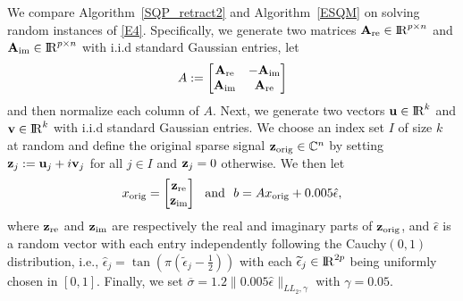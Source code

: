 \documentclass[10pt]{article}
\numberwithin{equation}{section}
\def\R{{\rm I\!R}}
\def\xorig{{x_{\rm orig}}}
\begin{document}
{\color{black}We compare Algorithm~\ref{SQP_retract2} and Algorithm~\ref{ESQM} on solving random instances of \eqref{E4}. Specifically, we generate two matrices ${\bf A}_{\rm re}\in \R^{p\times n}$ and ${\bf A}_{\rm im}\in \R^{p\times n}$ with i.i.d standard Gaussian entries, let
\begin{equation*}
A := \left[ \begin{matrix}
{\bf A}_{\rm re} & -{\bf A}_{\rm im}\\
{\bf A}_{\rm im} & {\bf A}_{\rm re}
\end{matrix} \right]
\end{equation*}
and then normalize each column of $A$. Next, we generate two vectors ${\bf u}\in\R^k$ and ${\bf v}\in\R^k$ with i.i.d standard Gaussian entries. We choose an index set $I$ of size $k$ at random and define the original sparse signal ${\bf z}_{\rm orig}\in {\mathbb{C}}^{n}$ by setting ${\bf z}_j := {\bf u}_j + i {\bf v}_j$ for all $j \in I$ and ${\bf z}_j = 0$ otherwise. We then let
\[
\xorig = \begin{bmatrix}
  {\bf z}_{\rm re}\\
  {\bf z}_{\rm im}
\end{bmatrix}\ \ {\rm and}\ \ b = A\xorig + 0.005\hat{\epsilon},
\]
where ${\bf z}_{\rm re}$ and ${\bf z}_{\rm im}$ are respectively the real and imaginary parts of ${\bf z}_{\rm orig}$, and $\hat{\epsilon}$ is a random vector with each entry independently following the Cauchy$(0, 1)$ distribution, i.e., $\hat{\epsilon}_{j} = \tan(\pi(\widetilde{\epsilon}_j - \frac{1}{2}))$ with each $\widetilde{\epsilon}_j\in\R^{2p}$ being uniformly chosen in $[0, 1]$. Finally, we set $\overline{\sigma} = 1.2\|0.005\hat{\epsilon}\|_{LL_2,\gamma}$ with $\gamma = 0.05$.}

\end{document}
